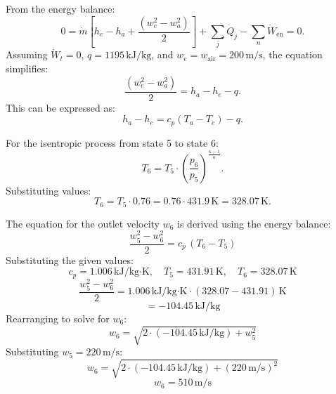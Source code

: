 From the energy balance:  
\[
0 = \dot{m} \left[ h_e - h_a + \frac{(w_e^2 - w_a^2)}{2} \right] + \sum_j \dot{Q}_j - \sum_n \dot{W}_{\text{en}} = 0.
\]  
Assuming \( \dot{W}_t = 0 \), \( q = 1195 \, \text{kJ/kg} \), and \( w_e = w_{\text{air}} = 200 \, \text{m/s} \), the equation simplifies:  
\[
\frac{(w_e^2 - w_a^2)}{2} = h_a - h_e - q.
\]  
This can be expressed as:  
\[
h_a - h_e = c_p (T_a - T_e) - q.
\]  

For the isentropic process from state 5 to state 6:  
\[
T_6 = T_5 \cdot \left( \frac{p_6}{p_5} \right)^{\frac{\kappa - 1}{\kappa}}.
\]  
Substituting values:  
\[
T_6 = T_5 \cdot 0.76 = 0.76 \cdot 431.9 \, \text{K} = 328.07 \, \text{K}.
\]

The equation for the outlet velocity \( w_6 \) is derived using the energy balance:  
\[
\frac{w_5^2 - w_6^2}{2} = c_p \, (T_6 - T_5)
\]  
Substituting the given values:  
\[
c_p = 1.006 \, \text{kJ/kg·K}, \quad T_5 = 431.91 \, \text{K}, \quad T_6 = 328.07 \, \text{K}
\]  
\[
\frac{w_5^2 - w_6^2}{2} = 1.006 \, \text{kJ/kg·K} \cdot (328.07 - 431.91) \, \text{K}
\]  
\[
= -104.45 \, \text{kJ/kg}
\]  
Rearranging to solve for \( w_6 \):  
\[
w_6 = \sqrt{2 \cdot (-104.45 \, \text{kJ/kg}) + w_5^2}
\]  
Substituting \( w_5 = 220 \, \text{m/s} \):  
\[
w_6 = \sqrt{2 \cdot (-104.45 \, \text{kJ/kg}) + (220 \, \text{m/s})^2}
\]  
\[
w_6 = 510 \, \text{m/s}
\]